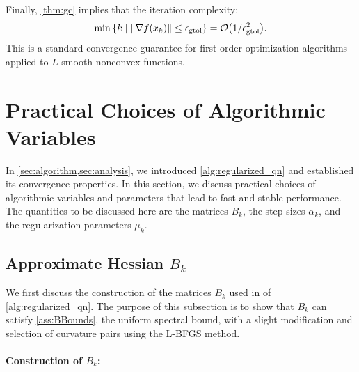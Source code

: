 \documentclass[journal]{subfiles}
\begin{document}
Finally, \cref{thm:gc} implies that the iteration complexity:
\begin{equation*}
    \min\left\{k \relmiddle| \norm{\nabla f(x_k)} \leq \gtol \right\} = \order{1/\gtol^2}.
\end{equation*}
This is a standard convergence guarantee for first-order optimization algorithms applied to $L$-smooth nonconvex functions.

\section{Practical Choices of Algorithmic Variables}\label{sec:proposed_choice}

In \cref{sec:algorithm,sec:analysis}, we introduced \cref{alg:regularized_qn} and established its convergence properties.
In this section, we discuss practical choices of algorithmic variables and parameters that lead to fast and stable performance.
The quantities to be discussed here are the matrices $B_k$, the step sizes $\alpha_k$, and the regularization parameters $\mu_k$.

\subsection{Approximate Hessian \texorpdfstring{$B_k$}{B k}}\label{sec:proposed_choice_Bk}

We first discuss the construction of the matrices $B_k$ used in  of \cref{alg:regularized_qn}.
The purpose of this subsection is to show that $B_k$ can satisfy \cref{ass:BBounds}, the uniform spectral bound, with a slight modification and selection of curvature pairs using the L-BFGS method.

\paragraph{Construction of $B_k$: }
\end{document}
